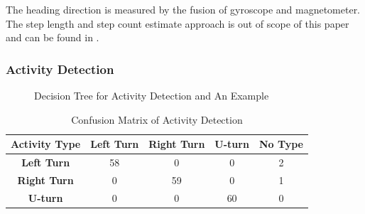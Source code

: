 \documentclass[conference]{IEEEtran}
\begin{document}
The heading direction is measured by the fusion of gyroscope and magnetometer. The step length and step count estimate approach is out of scope of this paper and can be found in \cite{wang2012no}.

\subsubsection{Activity Detection}

\begin{figure}[!ht]
	\vspace{-10pt}
	\centering
	\vfil
	\caption{Decision Tree for Activity Detection and An Example}
\end{figure}

\begin{table}
	\label{tab_conf}
	\caption{Confusion Matrix of Activity Detection}
	\begin{center}
		\begin{tabular}{| c | c | c | c | c |}
			\hline
			\bfseries Activity Type & \bfseries Left Turn & \bfseries Right Turn & \bfseries U-turn & \bfseries No Type\\
			\hline
			\bfseries Left Turn & 58 & 0 & 0 & 2 \\
			\hline
			\bfseries Right Turn & 0 & 59 & 0 & 1 \\
			\hline
			\bfseries U-turn & 0 & 0 & 60 & 0 \\
			\hline
		\end{tabular}
	\end{center}
\end{table}
\end{document}
